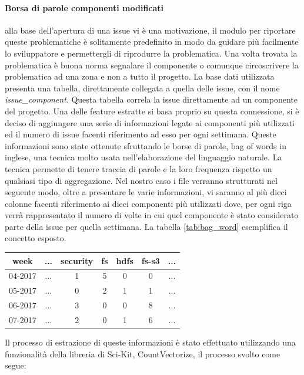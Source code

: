 \documentclass[%
    corpo=12pt,
    twoside,
    oldstyle,
    autoretitolo,
    greek,
    evenboxes,
]{toptesi}
\begin{document}
\paragraph{Borsa di parole componenti modificati} alla base dell'apertura di una issue vi è una motivazione, il modulo per riportare queste problematiche è solitamente predefinito in modo da guidare più facilmente lo sviluppatore e permettergli di riprodurre la problematica. Una volta trovata la problematica è buona norma segnalare il componente o comunque circoscrivere la problematica ad una zona e non a tutto il progetto. La base dati utilizzata presenta una tabella, direttamente collegata a quella delle issue, con il nome \textit{issue\_component}. Questa tabella correla la issue direttamente ad un componente del progetto. Una delle feature estratte si basa proprio su questa connessione, si è deciso di aggiungere una serie di informazioni legate ai componenti più utilizzati ed il numero di issue facenti riferimento ad esso per ogni settimana. Queste informazioni sono state ottenute sfruttando le borse di parole, bag of words in inglese, una tecnica molto usata nell'elaborazione del linguaggio naturale. La tecnica permette di tenere traccia di parole e la loro frequenza rispetto un qualsiasi tipo di aggregazione. Nel nostro caso i file verranno strutturati nel seguente modo, oltre a presentare le varie informazioni, vi saranno al più dieci colonne facenti riferimento ai dieci componenti più utilizzati dove, per ogni riga verrà rappresentato il numero di volte in cui quel componente è stato considerato parte della issue per quella settimana. La tabella \ref{tab:bag_word} esemplifica il concetto esposto.
\begin{center}
   \label{tab:bag_word}
  \begin{tabular}{ |c|c|c|c|c|c|c| }
     \hline
     \textbf{week} & \textbf{...} & \textbf{security} & \textbf{fs} & \textbf{hdfs} & \textbf{fs-s3} & \textbf{...} \\
     \hline
     \hline
     04-2017 & ... & 1 & 5 & 0 & 0 & ...\\
     \hline
     05-2017 & ... & 0 & 2 & 1 & 1 & ...\\
     \hline
     06-2017 & ... & 3 & 0 & 0 & 8 & ...\\
     \hline
     07-2017 & ... & 2 & 0 & 1 & 6 & ...\\
     \hline
  \end{tabular}
\end{center}
Il processo di estrazione di queste informazioni è stato effettuato utilizzando una funzionalità della libreria di Sci-Kit, CountVectorize, il processo svolto come segue:
\end{document}
